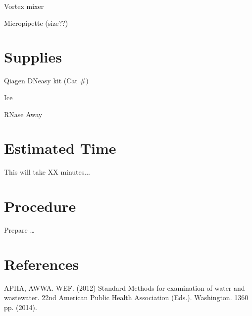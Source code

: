 \documentclass[12pt]{../SOP2}
\begin{document}
\NP Vortex mixer

\NP Micropipette (size??)

\section{Supplies}

\NP Qiagen DNeasy kit (Cat \#)

\NP Ice

\NP RNase Away



\section{Estimated Time}

\NP This will take XX minutes...

\section{Procedure}

\NP Prepare \dots

\NP

\section{References}

\NP APHA, AWWA. WEF. (2012) Standard Methods for examination of water and wastewater. 22nd American Public Health Association (Eds.). Washington. 1360 pp. (2014).
\end{document}
